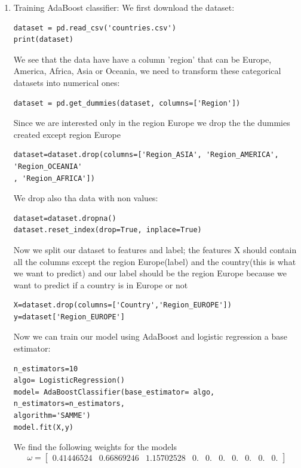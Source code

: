 \documentclass[12pt,a4paper]{report}
\begin{document}
\begin{enumerate}
\item Training AdaBoost classifier:
We first download the dataset:
\begin{verbatim}
dataset = pd.read_csv('countries.csv')
print(dataset)
\end{verbatim}

We see that the data have have a column 'region' that can be Europe, America, Africa, Asia or Oceania, we need to transform these categorical datasets into numerical ones:
\begin{verbatim}
dataset = pd.get_dummies(dataset, columns=['Region'])
\end{verbatim} 

Since we are interested only in the region Europe we drop the the dummies created except region Europe
\begin{verbatim}
dataset=dataset.drop(columns=['Region_ASIA', 'Region_AMERICA', 'Region_OCEANIA'
, 'Region_AFRICA'])
\end{verbatim}

We drop also tha data with non values: 
\begin{verbatim}
dataset=dataset.dropna()
dataset.reset_index(drop=True, inplace=True)
\end{verbatim}

Now we split our dataset to features and label; the features X should contain all the columns except the region Europe(label) and the country(this is what we want to predict) and our label should be the region Europe because we want to predict if a country is in Europe or not
\begin{verbatim}
X=dataset.drop(columns=['Country','Region_EUROPE'])
y=dataset['Region_EUROPE']
\end{verbatim}

Now we can train our model using AdaBoost and logistic regression a base estimator:
\begin{verbatim}
n_estimators=10
algo= LogisticRegression()
model= AdaBoostClassifier(base_estimator= algo, n_estimators=n_estimators, 
algorithm='SAMME')
model.fit(X,y)
\end{verbatim}

We find the following weights for the models
$$\omega= \left[ \begin{array}{cccccccccc}
0.41446524 &0.66869246 &1.15702528& 0.&         0. &        0.&
 0.      &   0.    &     0. &        0.        
\end{array} \right]$$


\end{enumerate}
\end{document}
